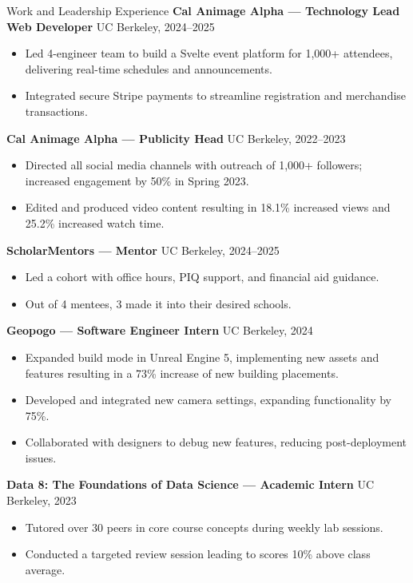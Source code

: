 \documentclass{resume}
\begin{document}
\begin{rSection}{Work and Leadership Experience}
\textbf{Cal Animage Alpha — Technology Lead Web Developer} \hfill UC Berkeley, 2024–2025
\begin{itemize}
  \item Led 4-engineer team to build a Svelte event platform for 1,000+ attendees, delivering real-time schedules and announcements.
  \item Integrated secure Stripe payments to streamline registration and merchandise transactions.
\end{itemize}

\textbf{Cal Animage Alpha — Publicity Head} \hfill UC Berkeley, 2022–2023
\begin{itemize}
  \item Directed all social media channels with outreach of 1,000+ followers; increased engagement by 50\% in Spring 2023.
  \item Edited and produced video content resulting in 18.1\% increased views and 25.2\% increased watch time.
\end{itemize}

\textbf{ScholarMentors — Mentor} \hfill UC Berkeley, 2024–2025
\begin{itemize}
  \item Led a cohort with office hours, PIQ support, and financial aid guidance.
  \item Out of 4 mentees, 3 made it into their desired schools.
\end{itemize}

\textbf{Geopogo — Software Engineer Intern} \hfill UC Berkeley, 2024
\begin{itemize}
  \item Expanded build mode in Unreal Engine 5, implementing new assets and features resulting in a 73\% increase of new building placements.
  \item Developed and integrated new camera settings, expanding functionality by 75\%.
  \item Collaborated with designers to debug new features, reducing post-deployment issues.
\end{itemize}

\textbf{Data 8: The Foundations of Data Science — Academic Intern} \hfill UC Berkeley, 2023
\begin{itemize}
  \item Tutored over 30 peers in core course concepts during weekly lab sessions.
  \item Conducted a targeted review session leading to scores 10\% above class average.
\end{itemize}


\end{rSection}
\end{document}
